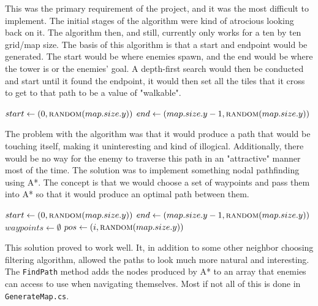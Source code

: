 \documentclass{article}
\begin{document}
This was the primary requirement of the project, and it was the most difficult to implement. The initial stages of the algorithm were kind of atrocious looking back on it. The algorithm then, and still, currently only works for a ten by ten grid/map size. The basis of this algorithm is that a start and endpoint would be generated. The start would be where enemies spawn, and the end would be where the tower is or the enemies' goal. A depth-first search would then be conducted and start until it found the endpoint, it would then set all the tiles that it cross to get to that path to be a value of "walkable".

\vspace{5mm}

\begin{algorithmic}
    \State $start \gets (0, \Call{random}{map.size.y})$
    \State $end \gets (map.size.y - 1, \Call{random}{map.size.y})$
    \State {}
    \EndProcedure
\end{algorithmic}

The problem with the algorithm was that it would produce a path that would be touching itself, making it uninteresting and kind of illogical. Additionally, there would be no way for the enemy to traverse this path in an "attractive" manner most of the time. The solution was to implement something nodal pathfinding using A*. The concept is that we would choose a set of waypoints and pass them into A* so that it would produce an optimal path between them.

\vspace{5mm}

\begin{algorithmic}
    \State $start \gets (0, \Call{random}{map.size.y})$
    \State $end \gets (map.size.y - 1, \Call{random}{map.size.y})$
    \State $waypoints \gets \emptyset$
    \State {}
    \State $pos \gets (i, \Call{random}{map.size.y})$
    \State {}
    \EndFor
    \State {}
    \State {}
    \EndFor
    \EndProcedure
\end{algorithmic}

This solution proved to work well. It, in addition to some other neighbor choosing filtering algorithm, allowed the paths to look much more natural and interesting. The \lstinline{FindPath} method adds the nodes produced by A* to an array that enemies can access to use when navigating themselves. Most if not all of this is done in \lstinline{GenerateMap.cs}.
\end{document}
